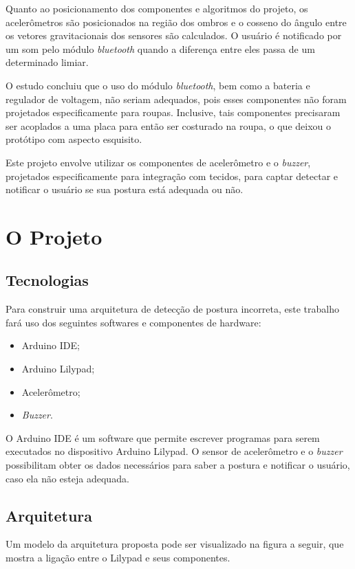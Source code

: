 \documentclass[12pt]{article}
\begin{document}
Quanto ao posicionamento dos componentes e algoritmos do projeto, os acelerômetros são posicionados na região dos ombros e o cosseno do ângulo entre os vetores gravitacionais dos sensores são calculados. O usuário é notificado por um som pelo módulo \textit{bluetooth} quando a diferença entre eles passa de um determinado limiar.

O estudo concluiu que o uso do módulo \textit{bluetooth}, bem como a bateria e regulador de voltagem, não seriam adequados, pois esses componentes não foram projetados especificamente para roupas. Inclusive, tais componentes precisaram ser acoplados a uma placa para então ser costurado na roupa, o que deixou o protótipo com aspecto esquisito.

Este projeto envolve utilizar os componentes de acelerômetro e o \textit{buzzer}, projetados especificamente para integração com tecidos, para captar detectar e notificar o usuário se sua postura está adequada ou não.

\section{O Projeto}

\subsection{Tecnologias}

Para construir uma arquitetura de detecção de postura incorreta, este trabalho fará uso dos seguintes softwares e componentes de hardware:

\begin{itemize}
    \item Arduino IDE;
    \item Arduino Lilypad;
    \item Acelerômetro;
    \item \textit{Buzzer}.
\end{itemize}

O Arduino IDE é um software que permite escrever programas para serem executados no dispositivo Arduino Lilypad. O sensor de acelerômetro e o \textit{buzzer} possibilitam obter os dados necessários para saber a postura e notificar o usuário, caso ela não esteja adequada.

\subsection{Arquitetura}

Um modelo da arquitetura proposta pode ser visualizado na figura a seguir, que mostra a ligação entre o Lilypad e seus componentes.
\end{document}
